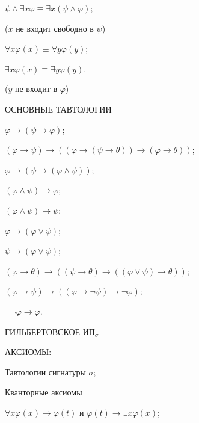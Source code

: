 \documentclass[a4paper,11pt]{article}
\begin{document}
\item $\psi \land\exists x \varphi \equiv\exists x (\psi \land \varphi)$;

($x$  не входит свободно в $\psi$)

\item $\forall x \varphi(x) \equiv\forall y \varphi(y)$; 

\item $\exists
x\varphi(x) \equiv \exists y\varphi(y)$.

($y$ не входит в $\varphi$)

\pagebreak

ОСНОВНЫЕ ТАВТОЛОГИИ
\medskip

\item $\varphi\rightarrow(\psi\rightarrow\varphi)$; 

\item $(\varphi\rightarrow\psi) \rightarrow ((\varphi\rightarrow (\psi
\rightarrow \theta))\rightarrow
(\varphi \rightarrow\theta))$;
\medskip

\item $\varphi \rightarrow (\psi\rightarrow (\varphi \land \psi))$;

\item $(\varphi
\land \psi)\rightarrow \varphi$;

\item $(\varphi \land \psi) \rightarrow\psi$; 
\medskip

\item $\varphi
\rightarrow
(\varphi \lor \psi)$;

\item $\psi \rightarrow (\varphi \lor \psi)$;

\item $(\varphi
\rightarrow \theta) \rightarrow ((\psi \rightarrow \theta)
\rightarrow ((\varphi \lor \psi) \rightarrow
\theta))$;
\medskip

\item $(\varphi \rightarrow \psi) \rightarrow ((\varphi \rightarrow
\neg\psi) \rightarrow \neg\varphi)$; 

\item $\neg\neg\varphi\rightarrow \varphi$.
\pagebreak


ГИЛЬБЕРТОВСКОЕ  ИП$_\sigma$

АКСИОМЫ: 

Тавтологии сигнатуры $\sigma$; 
\medskip

Кванторные аксиомы 

$\forall x \varphi(x)\rightarrow
\varphi(t)$ и $\varphi(t)\rightarrow \exists x \varphi(x)$;
\medskip
\end{document}
